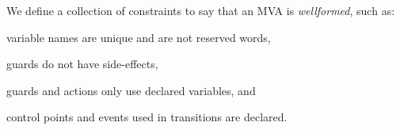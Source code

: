 We define a collection of constraints to say that an MVA is
\emph{wellformed}, such as:
\begin{inparaenum}[(\itshape i\upshape)]
\item variable names are unique and are not reserved words,
\item guards do not have side-effects,
\item guards and actions only use declared variables, and
\item control points and events used in transitions are declared.
\end{inparaenum}


